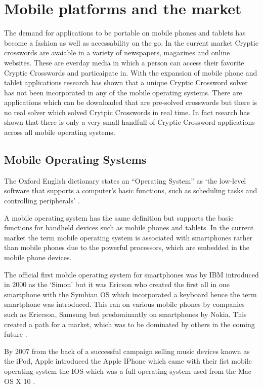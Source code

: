 \section{Mobile platforms and the market}

The demand for applications to be portable on mobile phones and tablets has become a fashion as well as accessability on the go. In the current market Cryptic crosswords are avaiable in a variety of newspapers, magazines and online websites. These are everday media in which a person can access their favorite Cryptic Crosswords and particaipate in. With the expansion of mobile phone and tablet applications research has shown that a unique Cryptic Crossword solver has not been incorporated in any of the mobile operating systems. There are applications which can be downloaded that are pre-solved crosswords but there is no real solver which solved Crytpic Crosswords in real time. In fact rsearch has shown that there is only a very small handfull of Cryptic Crossword applications across all mobile operating systems.

\subsection{Mobile Operating Systems}

The Oxford English dictionary states an ``Operating System'' as `the low-level software that supports a computer’s basic functions, such as scheduling tasks and controlling peripherals' \citep{oxford_dictionary11}.

A mobile operating system has the same definition but supports the basic functions for handheld devices such as mobile phones and tablets. In the current market the term mobile operating system is associated with smartphones rather than mobile phones due to the powerful processors, which are embedded in the mobile phone devices. 

The official first mobile operating system for smartphones was by IBM introduced in 2000 as the `Simon' but it was Ericson who created the first all in one smartphone with the Symbian OS which incorporated a keyboard hence the term smartphone was introduced. This ran on various mobile phones by companies such as Ericcson, Samsung but predominantly on smartphones by Nokia. This created a path for a market, which was to be dominated by others in the coming future \citep{smartphone11}.

By 2007 from the back of a successful campaign selling music devices known as the iPod, Apple introduced the Apple IPhone which came with their fist mobile operating system the IOS which was a full operating system used from the Mac OS X 10 \citep{macworld07}.

